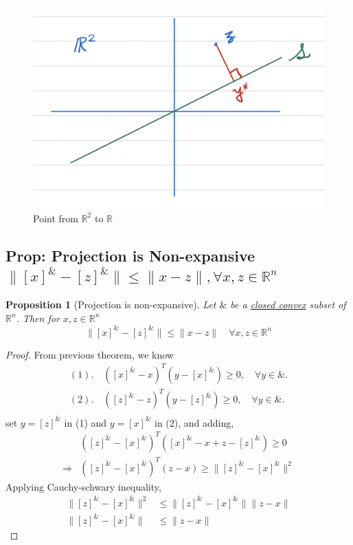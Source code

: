 \documentclass[11pt,a4paper]{article}
\newtheorem{proposition}{Proposition}
\begin{document}
\begin{center}\begin{figure}[htbp]
    \centering
    \includegraphics[scale=0.4]{proj1.png}
    \caption{Point from $\mathbb{R}^2$ to $\mathbb{R}$}
    \label{}
\end{figure}\end{center}

\subsection{Prop: Projection is Non-expansive $\|[x]^\&-[z]^\&\|\leq \|x-z\|,\forall x,z\in \mathbb{R}^n$}
\begin{proposition}
    [Projection is non-expansive]
    Let $\&$ be a \underline{closed convex} subset of $\mathbb{R}^n$. Then for $x,z\in \mathbb{R}^n$
    $$\|[x]^\&-[z]^\&\|\leq \|x-z\|\quad \forall x,z\in \mathbb{R}^n$$
\end{proposition}
\begin{proof}
From previous theorem, we know
\begin{equation}
    \begin{aligned}
        (1).\quad ([x]^\&-x)^T(y-[x]^\&)\geq 0,\quad \forall y\in\&.\\
        (2).\quad ([z]^\&-z)^T(y-[z]^\&)\geq 0,\quad \forall y\in\&.\\
    \end{aligned}
    \nonumber
\end{equation}
set $y=[z]^\&$ in (1) and $y=[x]^\&$ in (2), and adding,
\begin{equation}
    \begin{aligned}
        &([z]^\&-[x]^\&)^T([x]^\&-x+z-[z]^\&)\geq 0\\
        \Rightarrow	& ([z]^\&-[x]^\&)^T(z-x)\geq \|[z]^\&-[x]^\&\|^2
    \end{aligned}
    \nonumber
\end{equation}
Applying Cauchy-schwary inequality,
\begin{equation}
    \begin{aligned}
        \|[z]^\&-[x]^\&\|^2&\leq \|[z]^\&-[x]^\&\|\|z-x\|\\
        \|[z]^\&-[x]^\&\|&\leq \|z-x\|
    \end{aligned}
    \nonumber
\end{equation}
\end{proof}
\end{document}
